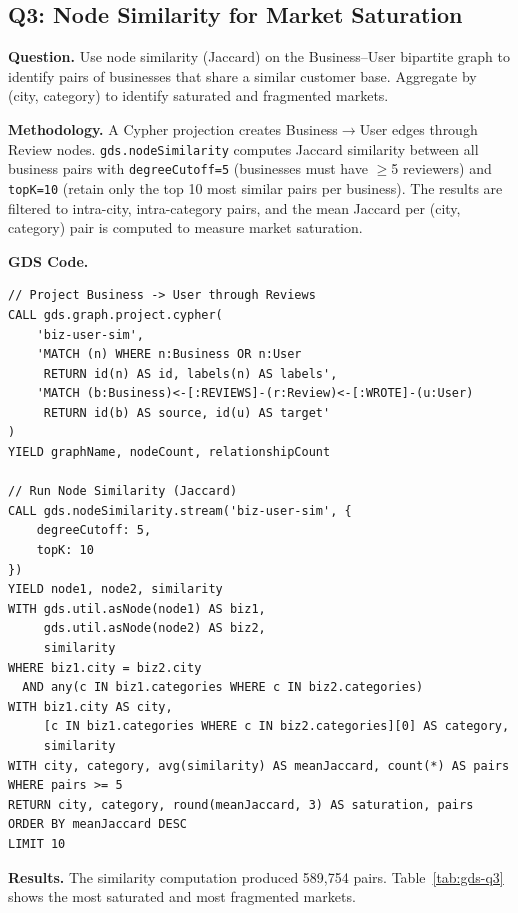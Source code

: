 \documentclass[11pt]{article}
\begin{document}
\clearpage
\subsection{Q3: Node Similarity for Market Saturation}

\textbf{Question.} Use node similarity (Jaccard) on the Business--User bipartite graph to identify pairs of businesses that share a similar customer base. Aggregate by (city, category) to identify saturated and fragmented markets.

\textbf{Methodology.} A Cypher projection creates Business$\to$User edges through Review nodes. \texttt{gds.nodeSimilarity} computes Jaccard similarity between all business pairs with \texttt{degreeCutoff=5} (businesses must have $\geq$5 reviewers) and \texttt{topK=10} (retain only the top 10 most similar pairs per business). The results are filtered to intra-city, intra-category pairs, and the mean Jaccard per (city, category) pair is computed to measure market saturation.

\textbf{GDS Code.}
\begin{lstlisting}[style=cypher, caption={Node similarity for market saturation analysis.}, label={lst:gds-q3}]
// Project Business -> User through Reviews
CALL gds.graph.project.cypher(
    'biz-user-sim',
    'MATCH (n) WHERE n:Business OR n:User
     RETURN id(n) AS id, labels(n) AS labels',
    'MATCH (b:Business)<-[:REVIEWS]-(r:Review)<-[:WROTE]-(u:User)
     RETURN id(b) AS source, id(u) AS target'
)
YIELD graphName, nodeCount, relationshipCount

// Run Node Similarity (Jaccard)
CALL gds.nodeSimilarity.stream('biz-user-sim', {
    degreeCutoff: 5,
    topK: 10
})
YIELD node1, node2, similarity
WITH gds.util.asNode(node1) AS biz1,
     gds.util.asNode(node2) AS biz2,
     similarity
WHERE biz1.city = biz2.city
  AND any(c IN biz1.categories WHERE c IN biz2.categories)
WITH biz1.city AS city,
     [c IN biz1.categories WHERE c IN biz2.categories][0] AS category,
     similarity
WITH city, category, avg(similarity) AS meanJaccard, count(*) AS pairs
WHERE pairs >= 5
RETURN city, category, round(meanJaccard, 3) AS saturation, pairs
ORDER BY meanJaccard DESC
LIMIT 10
\end{lstlisting}

\textbf{Results.} The similarity computation produced 589,754 pairs. Table~\ref{tab:gds-q3} shows the most saturated and most fragmented markets.
\end{document}
